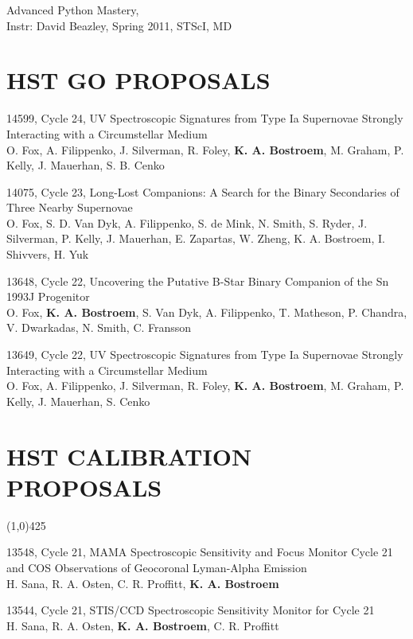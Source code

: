 \documentclass{res}
\begin{document}
\begin{resume}
Advanced Python Mastery, \\
Instr: David Beazley, Spring 2011, STScI, MD


\section{HST GO PROPOSALS}
14599, Cycle 24, UV Spectroscopic Signatures from Type Ia Supernovae Strongly Interacting with a Circumstellar Medium\\
O. Fox, A. Filippenko, J. Silverman, R. Foley, {\bf K. A. Bostroem}, M. Graham, P. Kelly, J. Mauerhan, S. B. Cenko

14075, Cycle 23, Long-Lost Companions: A Search for the Binary Secondaries of Three Nearby Supernovae \\
O. Fox, S. D. Van Dyk,  A. Filippenko, S. de Mink, N. Smith, S. Ryder, J. Silverman, P. Kelly, J. Mauerhan, E. Zapartas, W. Zheng, K. A. Bostroem, I. Shivvers, H. Yuk           

13648, Cycle 22, Uncovering the Putative B-Star Binary Companion of the Sn 1993J Progenitor\\
O. Fox, {\bf K. A. Bostroem}, S. Van Dyk, A. Filippenko, T. Matheson, P. Chandra, V. Dwarkadas, N. Smith, C. Fransson 

13649, Cycle 22, UV Spectroscopic Signatures from Type Ia Supernovae Strongly Interacting with a Circumstellar Medium \\
O. Fox, A. Filippenko, J. Silverman, R. Foley, {\bf K. A. Bostroem}, M. Graham, P. Kelly, J. Mauerhan, S. Cenko

\section{HST CALIBRATION PROPOSALS}
\vspace{-.2in} 
\begin{center}
\line(1,0){425}
\end{center}
\vspace{-.25in} 
\vspace{0.1in}

13548, Cycle 21, MAMA Spectroscopic Sensitivity and Focus Monitor Cycle 21 and COS Observations of Geocoronal Lyman-Alpha Emission \\
H. Sana, R. A. Osten, C. R. Proffitt, {\bf K. A. Bostroem}

13544, Cycle 21, STIS/CCD Spectroscopic Sensitivity Monitor for Cycle 21 \\
H. Sana, R. A. Osten, {\bf K. A. Bostroem}, C. R. Proffitt


\end{resume}
\end{document}
